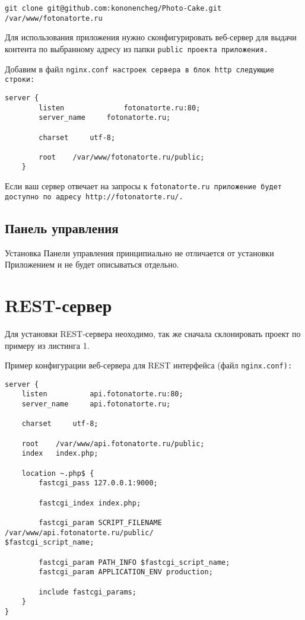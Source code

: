 \documentclass[a4paper,12pt]{report}
\begin{document}
			\tt{\begin{lstlisting}[caption={Клонирование проекта}]
git clone git@github.com:kononencheg/Photo-Cake.git /var/www/fotonatorte.ru
			\end{lstlisting}}
			
	
		Для использования  приложения нужно сконфигурировать веб-сервер для выдачи контента по выбранному адресу из папки \tt{public} проекта приложения.
	
		Добавим в файл \tt{nginx.conf} настроек сервера в блок \tt{http} следующие строки:
	
		\tt{\begin{lstlisting}[caption={Конфигурация веб-сервера приложения}]
	server {
		listen				fotonatorte.ru:80;
		server_name		fotonatorte.ru;
		
		charset		utf-8;
		
		root	/var/www/fotonatorte.ru/public;
	}
		\end{lstlisting}}
	
		Если ваш сервер отвечает на запросы к \tt{fotonatorte.ru}  приложение будет доступно по адресу \tt{http://fotonatorte.ru/}.
		
		\section*{Панель управления}
	
			Установка Панели управления принципиально не отличается от установки Приложением и не будет описываться отдельно.

	\chapter*{REST-сервер}
	
		Для установки REST-сервера неоходимо, так же сначала склонировать проект по примеру из листинга 1. 
		
		Пример конфигурации веб-сервера для REST интерфейса (файл \tt{nginx.conf}):
		
		\tt{\begin{lstlisting}[caption={Конфигурация REST-сервера}]
server {
	listen          api.fotonatorte.ru:80;
	server_name     api.fotonatorte.ru;

	charset     utf-8;

	root    /var/www/api.fotonatorte.ru/public;
	index   index.php;

	location ~.php$ {
		fastcgi_pass 127.0.0.1:9000;
		
		fastcgi_index index.php;
		
		fastcgi_param SCRIPT_FILENAME /var/www/api.fotonatorte.ru/public/
$fastcgi_script_name;

		fastcgi_param PATH_INFO $fastcgi_script_name;  
		fastcgi_param APPLICATION_ENV production;

		include fastcgi_params;
	}
}
		\end{lstlisting}}
		
\end{document}
